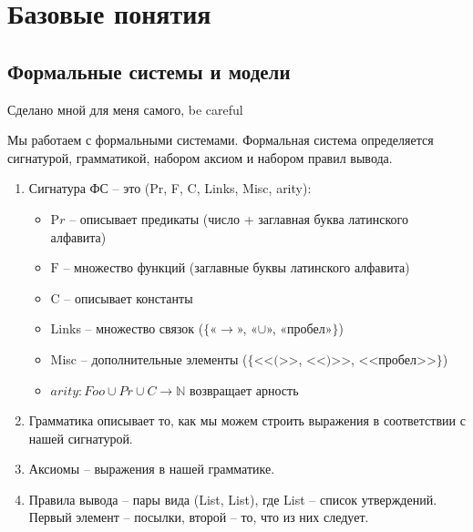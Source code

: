 \section*{Базовые понятия}
\label{sec-1}
\subsection*{Формальные системы и модели}
\label{sec-1-1}
Сделано мной для меня самого, be careful

Мы работаем с формальными системами.
Формальная система определяется сигнатурой, грамматикой,
набором аксиом и набором правил вывода.
\begin{enumerate}
\item Сигнатура ФС -- это (Pr, F, C, Links, Misc, arity):
\begin{itemize}
\item $\mathrm Pr$ -- описывает предикаты (число + заглавная буква латинского алфавита)
\item $\mathrm F$ -- множество функций (заглавные буквы латинского алфавита)
\item $\mathrm C$ -- описывает константы
\item Links -- множество связок ($\lbrace$«$\to$», «$\cup$», «пробел»$\rbrace$)
\item Misc -- дополнительные элементы ($\lbrace$<<$($>>, <<$)$>>, <<пробел>>$\rbrace$)
\item $arity\colon Foo \cup Pr \cup C \to \mathbb N$ возвращает арность
\end{itemize}
\item Грамматика описывает то, как мы можем строить выражения
в соответствии с нашей сигнатурой.
\item Аксиомы -- выражения в нашей грамматике.
\item Правила вывода -- пары вида (List, List), где List --
список утверждений. Первый элемент – посылки, второй --
то, что из них следует.
\end{enumerate}

